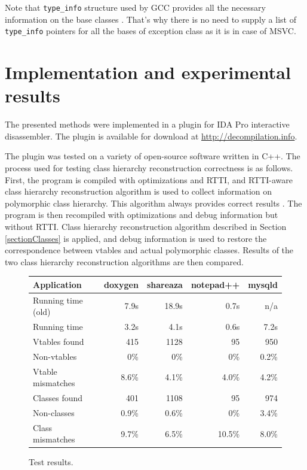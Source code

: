 \documentclass[times, 10pt,twocolumn]{article}
\renewcommand{\~}{{\raise.35ex\hbox{$\scriptstyle\sim$}}}
\begin{document}
Note that \lstinline{type_info} structure used by GCC provides
all the necessary information on the base classes \cite{gccabi}.
That's why there is no need to supply a list of \lstinline{type_info}
pointers for all the bases of exception class as it is in case of MSVC.






\quad
\section{Implementation and experimental results}\label{sectionExperiments}
The presented methods were implemented in a plugin
for IDA Pro interactive disassembler.
The plugin is available for download at \url{http://decompilation.info}.

The plugin was tested on a variety of open-source software written in C++.
The process used for testing class hierarchy reconstruction correctness is as follows.
First, the program is compiled with optimizations and RTTI, and
RTTI-aware class hierarchy reconstruction algorithm is used to collect information
on polymorphic class hierarchy. This algorithm always provides correct results \cite{fokin10}.
The program is then recompiled with optimizations and debug information but without RTTI.
Class hierarchy reconstruction algorithm described in Section \ref{sectionClasses} is applied,
and debug information is used to restore the correspondence between vtables and
actual polymorphic classes.
Results of the two class hierarchy reconstruction algorithms are then compared.

\begin{figure}[htb!]
\footnotesize
\begin{tabular}{| l | r | r | r | r |}
\hline
Application &         doxygen & shareaza & notepad++ & mysqld \\
\hline
Running time (old) &    7.9s  &   18.9s  & 0.7s      & n/a    \\
\hline
Running time &          3.2s  &   4.1s   & 0.6s      & 7.2s\\
\hline
Vtables found &         415   &   1128   &   95      & 950 \\
\hline
Non-vtables &           0\%   &   0\%    &   0\%     & 0.2\% \\
\hline
Vtable mismatches &     8.6\% &    4.1\% & 4.0\%     & 4.2\% \\
\hline
Classes found &         401   &   1108   &  95       & 974 \\
\hline
Non-classes &           0.9\% &    0.6\% &   0\%     & 3.4\% \\
\hline
Class mismatches &      9.7\% &    6.5\% & 10.5\%    & 8.0\% \\
\hline
\end{tabular}
\caption{Test results.}
\label{fig:tests}
\end{figure}
\end{document}
